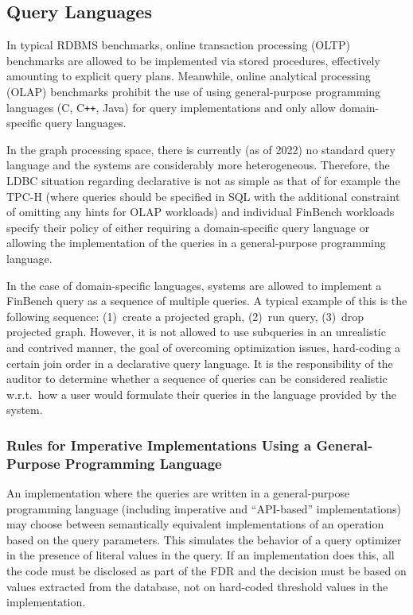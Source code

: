 \subsection{Query Languages}
\label{sec:query-languages}

In typical RDBMS benchmarks, online transaction processing (OLTP) benchmarks are allowed to be implemented via stored procedures, effectively amounting to explicit query plans.
Meanwhile, online analytical processing (OLAP) benchmarks prohibit the use of using general-purpose programming languages (\eg C, C\texttt{++}, Java) for query implementations and only allow domain-specific query languages.

In the graph processing space, there is currently (as of 2022) no standard query language and the systems are considerably more heterogeneous.
Therefore, the LDBC situation regarding declarative is not as simple as that of for example the \mbox{TPC-H} (where queries should be specified in SQL with the additional constraint of omitting any hints for OLAP workloads) and individual FinBench workloads specify their policy of either requiring a domain-specific query language or allowing the implementation of the queries in a general-purpose programming language.

In the case of domain-specific languages, systems are allowed to implement a FinBench query as a sequence of multiple queries.
A typical example of this is the following sequence:
(1)~create a projected graph,
(2)~run query,
(3)~drop projected graph.
However, it is not allowed to use subqueries in an unrealistic and contrived manner, \ie the goal of overcoming optimization issues, \eg hard-coding a certain join order in a declarative query language.
It is the responsibility of the auditor to determine whether a sequence of queries can be considered realistic w.r.t.\ how a user would formulate their queries in the language provided by the system.

\subsubsection{Rules for Imperative Implementations Using a General-Purpose Programming Language}
An implementation where the queries are written in a general-purpose programming language (including imperative and ``API-based'' implementations) may choose between semantically equivalent implementations of an operation based on the query parameters. This simulates the behavior of a query optimizer in the presence of literal values in the query. If an implementation does this, all the code must be disclosed as part of the FDR and the decision must be based on values extracted from the database, not on hard-coded threshold values in the implementation.

